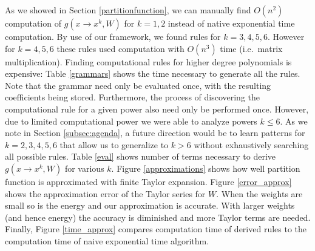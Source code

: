 As we showed in Section \ref{partitionfunction}, we can manually find
$O(n^2)$ computation of $g(x \rightarrow x^k, W)$ for $k = 1, 2$
instead of native exponential time computation. By use of our
framework, we found rules for $k = 3, 4, 5, 6$. However for $k = 4, 5, 6$
these rules used computation with $O(n^3)$ time (i.e.~matrix
multiplication). Finding computational rules for higher degree
polynomials is expensive: Table \ref{grammars} shows the time
necessary to generate all the rules. Note that the grammar
need only be evaluated once, with the resulting coefficients being
stored. Furthermore, the process of discovering the computational rule
for a given power also need only be performed once. However, due to limited computational
power we were able to analyze powers $k \leq 6$. As we note in Section
\ref{subsec:agenda}, a future direction would be to learn patterns for
$k=2, 3, 4, 5, 6$ that allow us to generalize to $k>6$ without exhaustively
searching all possible rules. 
Table \ref{eval} shows number of terms necessary to derive $g(x
\rightarrow x^k, W)$ for various $k$. Figure \ref{approximations}
shows how well partition function is approximated with finite Taylor
expansion. Figure \ref{error_approx} shows the approximation error of
the Taylor series for $W$. When the weights are small so is the energy
and our approximation is accurate. With larger weights (and hence
energy) the accuracy is diminished and more Taylor terms are needed. Finally,
Figure \ref{time_approx} compares computation time of derived rules to
the computation time of naive exponential time algorithm.




